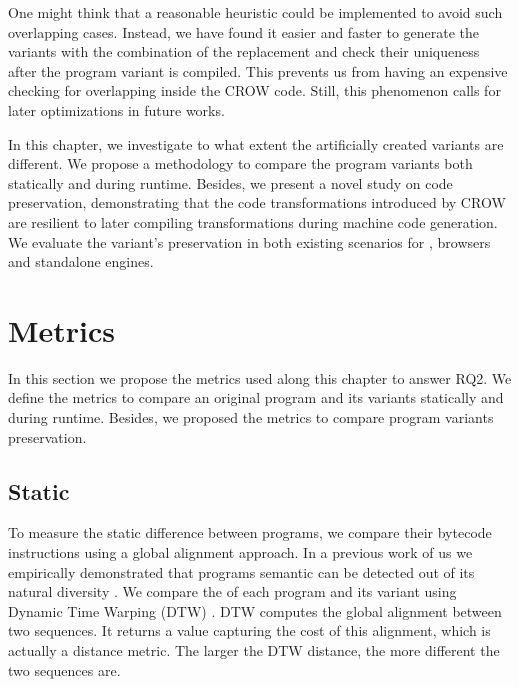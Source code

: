 One might think that a reasonable heuristic could be implemented to avoid such overlapping cases. Instead, we have found it easier and faster to generate the variants with the combination of the replacement and check their uniqueness after the program variant is compiled. This prevents us from having an expensive checking for overlapping inside the CROW code. Still, this phenomenon calls for later optimizations in future works.




In this chapter, we investigate to what extent the artificially created variants are different. We propose a methodology to compare the program variants both statically and during runtime. Besides, we present a novel study on code preservation, demonstrating that the code transformations introduced by CROW are resilient to later compiling transformations during machine code generation. We evaluate the variant's preservation in both existing scenarios for \wasm, browsers and standalone engines.

\section{Metrics}

In this section we propose the metrics used along this chapter to answer RQ2. We define the metrics to compare an original program and its variants statically and during runtime. Besides, we proposed the metrics to compare program variants preservation.

\subsection{Static}

To measure the static difference between programs, we compare their bytecode instructions using a global alignment approach. In a previous work of us we empirically demonstrated that programs semantic can be detected out of its natural diversity \citationneeded. We compare the \wasm of each program and its variant using Dynamic Time Warping (DTW) \cite{Maia08usinga}. DTW computes the global alignment between two sequences. It returns a value capturing the cost of this alignment, which is actually a distance metric. The larger the DTW distance, the more different the two sequences are.


